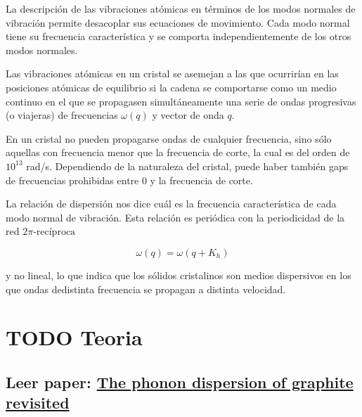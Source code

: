 \documentclass[11pt]{article}
\begin{document}
La descripción de las vibraciones atómicas en términos de los modos normales de vibración permite desacoplar sus ecuaciones de movimiento. Cada modo normal tiene su frecuencia característica y se comporta independientemente de los otros modos normales.

Las vibraciones atómicas en un cristal se asemejan a las que ocurrirían en las posiciones atómicas de equilibrio si la cadena se comportarse como un medio continuo en el que se propagasen simultáneamente una serie de ondas progresivas (o viajeras) de frecuencias \(\omega(q)\) y vector de onda \(q\).

En un cristal no pueden propagarse ondas de cualquier frecuencia, sino sólo aquellas con frecuencia menor que la frecuencia de corte, la cual es del orden de \(10^{13}\) rad/s. Dependiendo de la naturaleza del cristal, puede haber también gaps de frecuencias prohibidas entre 0 y la frecuencia de corte.

La relación de dispersión nos dice cuál es la frecuencia característica de cada modo normal de vibración. Esta relación es periódica con la periodicidad de la red \(2\pi\text{-recíproca}\)

\begin{equation*}
\omega(q)=\omega(q+K_h)
\end{equation*}

y no lineal, lo que indica que los sólidos cristalinos son medios dispersivos en los que ondas dedistinta frecuencia se propagan a distinta velocidad.


\section{{\bfseries\sffamily TODO} Teoria}
\label{sec:org3dd8427}
\subsection{Leer paper: \href{wirtz2004.pdf}{The phonon dispersion of graphite revisited}}
\label{sec:org3c6a681}
\end{document}
